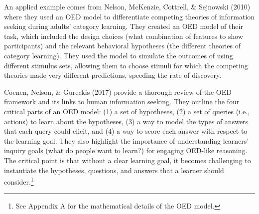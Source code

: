 \documentclass[oneside]{report}
\begin{document}
An applied example comes from Nelson, McKenzie, Cottrell, \& Sejnowski
(2010) where they used an OED model to differentiate competing theories
of information seeking during adults' category learning. They created an
OED model of their task, which included the design choices (what
combination of features to show participants) and the relevant
behavioral hypotheses (the different theories of category learning).
They used the model to simulate the outcomes of using different stimulus
sets, allowing them to choose stimuli for which the competing theories
made very different predictions, speeding the rate of discovery.


Coenen, Nelson, \& Gureckis (2017) provide a thorough review of the OED
framework and its links to human information seeking. They outline the
four critical parts of an OED model: (1) a set of hypotheses, (2) a set
of queries (i.e., actions) to learn about the hypotheses, (3) a way to
model the types of answers that each query could elicit, and (4) a way
to score each answer with respect to the learning goal. They also
highlight the importance of understanding learners' inquiry goals (what
do people want to learn?) for engaging OED-like reasoning. The critical
point is that without a clear learning goal, it becomes challenging to
instantiate the hypotheses, questions, and answers that a learner should
consider.\footnote{See Appendix A for the mathematical details of the
  OED model.}
\end{document}
